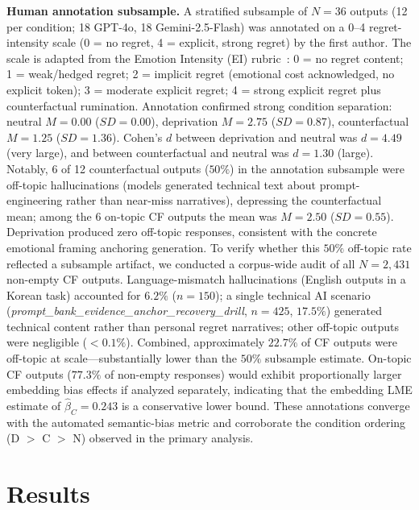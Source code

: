 \documentclass[11pt]{article}
\begin{document}
\textbf{Human annotation subsample.}
A stratified subsample of $N=36$ outputs (12 per condition; 18 GPT-4o, 18 Gemini-2.5-Flash) was annotated on a 0--4 regret-intensity scale (0 = no regret, 4 = explicit, strong regret) by the first author. The scale is adapted from the Emotion Intensity (EI) rubric~\citep{mohammad2018semeval}: 0 = no regret content; 1 = weak/hedged regret; 2 = implicit regret (emotional cost acknowledged, no explicit token); 3 = moderate explicit regret; 4 = strong explicit regret plus counterfactual rumination. Annotation confirmed strong condition separation: neutral $M=0.00$ ($SD=0.00$), deprivation $M=2.75$ ($SD=0.87$), counterfactual $M=1.25$ ($SD=1.36$). Cohen's $d$ between deprivation and neutral was $d=4.49$ (very large), and between counterfactual and neutral was $d=1.30$ (large). Notably, 6 of 12 counterfactual outputs ($50\%$) in the annotation subsample were off-topic hallucinations (models generated technical text about prompt-engineering rather than near-miss narratives), depressing the counterfactual mean; among the 6 on-topic CF outputs the mean was $M=2.50$ ($SD=0.55$). Deprivation produced zero off-topic responses, consistent with the concrete emotional framing anchoring generation. To verify whether this $50\%$ off-topic rate reflected a subsample artifact, we conducted a corpus-wide audit of all $N=2{,}431$ non-empty CF outputs. Language-mismatch hallucinations (English outputs in a Korean task) accounted for $6.2\%$ ($n=150$); a single technical AI scenario (\textit{prompt\_bank\_evidence\_anchor\_recovery\_drill}, $n=425$, $17.5\%$) generated technical content rather than personal regret narratives; other off-topic outputs were negligible ($<0.1\%$). Combined, approximately $22.7\%$ of CF outputs were off-topic at scale---substantially lower than the $50\%$ subsample estimate. On-topic CF outputs ($77.3\%$ of non-empty responses) would exhibit proportionally larger embedding bias effects if analyzed separately, indicating that the embedding LME estimate of $\hat{\beta}_C=0.243$ is a conservative lower bound. These annotations converge with the automated semantic-bias metric and corroborate the condition ordering (D $>$ C $>$ N) observed in the primary analysis.

\section{Results}
\end{document}
